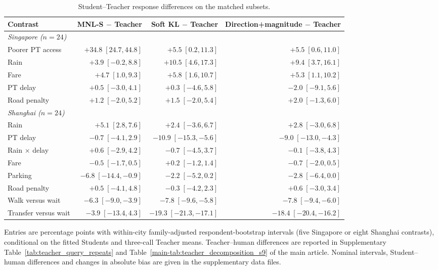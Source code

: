 \begin{table}[pos=htbp]
\centering\small
\caption{Student--Teacher response differences on the matched subsets.}
\label{tab:teacher_decomposition_combined}
\setlength{\tabcolsep}{3pt}
\renewcommand{\arraystretch}{1.10}
\begin{tabular*}{\linewidth}{@{\extracolsep{\fill}}lrrr@{}}
\toprule
Contrast & MNL-S $-$ Teacher & Soft KL $-$ Teacher & Direction+magnitude $-$ Teacher \\
\midrule
\multicolumn{4}{l}{\textit{Singapore ($n=24$)}} \\
Poorer PT access & $+34.8\;[24.7,44.8]$ & $+5.5\;[0.2,11.3]$ & $+5.5\;[0.6,11.0]$ \\
Rain & $+3.9\;[-0.2,8.8]$ & $+10.5\;[4.6,17.3]$ & $+9.4\;[3.7,16.1]$ \\
Fare & $+4.7\;[1.0,9.3]$ & $+5.8\;[1.6,10.7]$ & $+5.3\;[1.1,10.2]$ \\
PT delay & $+0.5\;[-3.0,4.1]$ & $+0.3\;[-4.6,5.8]$ & $-2.0\;[-9.1,5.6]$ \\
Road penalty & $+1.2\;[-2.0,5.2]$ & $+1.5\;[-2.0,5.4]$ & $+2.0\;[-1.3,6.0]$ \\
\midrule
\multicolumn{4}{l}{\textit{Shanghai ($n=24$)}} \\
Rain & $+5.1\;[2.8,7.6]$ & $+2.4\;[-3.6,6.7]$ & $+2.8\;[-3.0,6.8]$ \\
PT delay & $-0.7\;[-4.1,2.9]$ & $-10.9\;[-15.3,-5.6]$ & $-9.0\;[-13.0,-4.3]$ \\
Rain $\times$ delay & $+0.6\;[-2.9,4.2]$ & $-0.7\;[-4.5,3.7]$ & $-0.1\;[-3.8,4.3]$ \\
Fare & $-0.5\;[-1.7,0.5]$ & $+0.2\;[-1.2,1.4]$ & $-0.7\;[-2.0,0.5]$ \\
Parking & $-6.8\;[-14.4,-0.9]$ & $-2.2\;[-5.2,0.2]$ & $-2.8\;[-6.4,0.0]$ \\
Road penalty & $+0.5\;[-4.1,4.8]$ & $-0.3\;[-4.2,2.3]$ & $+0.6\;[-3.0,3.4]$ \\
Walk versus wait & $-6.3\;[-9.0,-3.9]$ & $-7.8\;[-9.6,-5.8]$ & $-7.8\;[-9.4,-6.0]$ \\
Transfer versus wait & $-3.9\;[-13.4,4.3]$ & $-19.3\;[-21.3,-17.1]$ & $-18.4\;[-20.4,-16.2]$ \\
\bottomrule
\end{tabular*}
\par\smallskip\begin{minipage}{\linewidth}\footnotesize
Entries are percentage points with within-city family-adjusted respondent-bootstrap intervals (five Singapore or eight Shanghai contrasts), conditional on the fitted Students and three-call Teacher means. Teacher--human differences are reported in Supplementary Table~\ref{tab:teacher_query_repeats} and Table~\ref{main-tab:teacher_decomposition_s9} of the main article. Nominal intervals, Student--human differences and changes in absolute bias are given in the supplementary data files.
\end{minipage}
\end{table}
